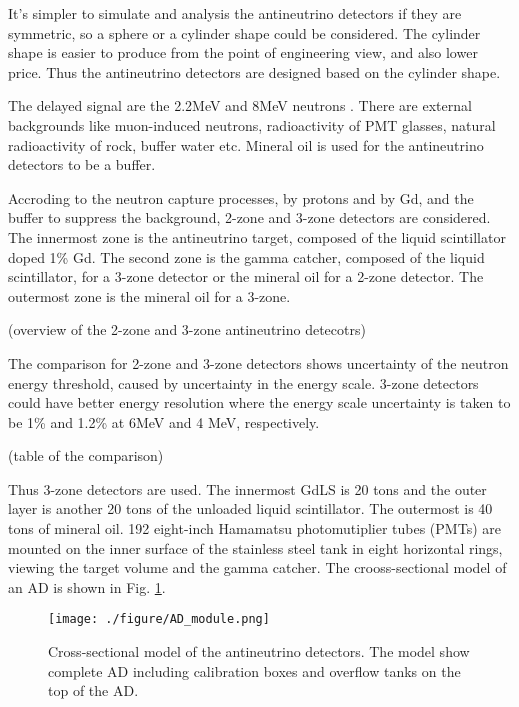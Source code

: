 It's simpler to simulate and analysis the antineutrino detectors if they are
symmetric, so a sphere or a cylinder shape could be considered. The cylinder
shape is easier to produce from the point of engineering view, and also lower
price. Thus the antineutrino detectors are designed based on the cylinder shape.

The delayed signal are the 2.2MeV and 8MeV neutrons . There are external backgrounds like
muon-induced neutrons, radioactivity of PMT glasses, natural radioactivity of rock,
buffer water etc. Mineral oil is used for the antineutrino detectors to be a buffer.

Accroding to the neutron capture processes, by protons and by Gd, and the buffer to
suppress the background, 2-zone and 3-zone detectors are considered. The innermost
zone is the antineutrino target, composed of the liquid scintillator doped 1\% Gd.
The second zone is the gamma catcher, composed of the liquid scintillator, for a
3-zone detector or the mineral oil for a 2-zone detector. The outermost zone
is the mineral oil for a 3-zone.

(overview of the 2-zone and 3-zone antineutrino detecotrs)


The comparison for 2-zone and 3-zone detectors shows 
uncertainty of the neutron energy threshold, caused by uncertainty in the energy scale.
3-zone detectors could have better energy resolution where the energy scale
uncertainty is taken to be 1\% and 1.2\% at 6MeV and 4 MeV, respectively.

(table of the comparison)

Thus 3-zone detectors are used. The innermost GdLS is 20 tons and the outer layer is another
20 tons of the unloaded  liquid scintillator. The outermost is 40 tons of mineral oil. 192 eight-inch
Hamamatsu photomutiplier tubes (PMTs) are mounted on the inner surface of the stainless steel tank
in eight horizontal rings, viewing the target volume and the gamma catcher. The crooss-sectional model of an AD
is shown in Fig. \ref{fig:AD_module.png}.

\begin{figure}[h]
    \centering
    \texttt{[image: ./figure/AD\_module.png]}
    \caption{Cross-sectional model of the antineutrino detectors.
The model show complete AD including calibration boxes and overflow tanks on the top of the AD.}
    \label{fig:AD_module.png}
    \end{figure}





